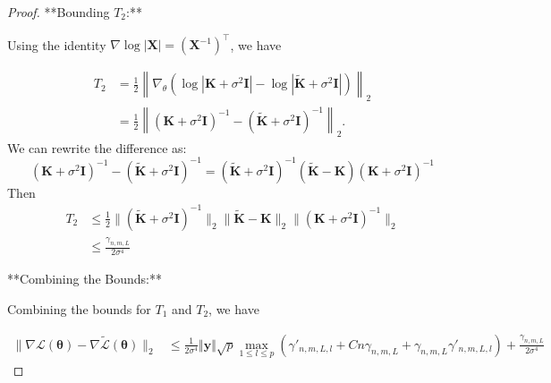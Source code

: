 \begin{proof}

**Bounding $T_2$:**

Using the identity $\nabla \log |\mathbf{X}| = (\mathbf{X}^{-1})^\top$, we have

\begin{align*}
T_2 &= \frac{1}{2} \left\| \nabla_\theta \left( \log |\mathbf{K} + \sigma^2 \mathbf{I}| - \log |\tilde{\mathbf{K}} + \sigma^2 \mathbf{I}| \right) \right\|_2 \\
&= \frac{1}{2} \left\| (\mathbf{K} + \sigma^2 \mathbf{I})^{-1} - (\tilde{\mathbf{K}} + \sigma^2 \mathbf{I})^{-1} \right\|_2.
\end{align*}
We can rewrite the difference as:
$$
(\mathbf{K} + \sigma^2 \mathbf{I})^{-1} - (\tilde{\mathbf{K}} + \sigma^2 \mathbf{I})^{-1} = (\tilde{\mathbf{K}} + \sigma^2 \mathbf{I})^{-1} (\tilde{\mathbf{K}} - \mathbf{K}) (\mathbf{K} + \sigma^2 \mathbf{I})^{-1}
$$
Then
\begin{align*}
T_2 &\leq \frac{1}{2} \| (\tilde{\mathbf{K}} + \sigma^2 \mathbf{I})^{-1} \|_2 \| \tilde{\mathbf{K}} - \mathbf{K} \|_2 \| (\mathbf{K} + \sigma^2 \mathbf{I})^{-1} \|_2 \\
    &\leq \frac{\gamma_{n,m,L}}{2\sigma^4}
\end{align*}

**Combining the Bounds:**

Combining the bounds for $T_1$ and $T_2$, we have

\begin{align*}
\| \nabla \mathcal{L}(\boldsymbol{\theta}) - \nabla \tilde{\mathcal{L}}(\boldsymbol{\theta}) \|_2 &\leq \frac{1}{2\sigma^4}\Vert \textbf{y}\Vert\sqrt{p}\max_{1\leq l\leq p} \left( \gamma'_{n,m,L,l}+Cn\gamma_{n,m,L}+\gamma_{n,m,L}\gamma'_{n,m,L,l} \right)+\frac{\gamma_{n,m,L}}{2\sigma^4}
\end{align*}
\end{proof}
